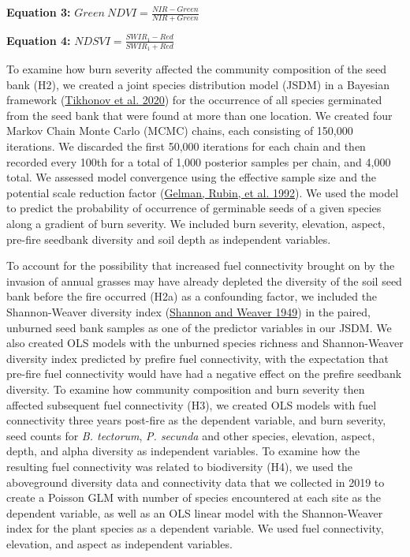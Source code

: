 \documentclass[
  12pt,
]{article}
\begin{document}
\textbf{Equation 3:} \(Green~NDVI = \frac{NIR - Green}{NIR + Green}\)

\textbf{Equation 4:} \(NDSVI = \frac{SWIR_1 - Red}{SWIR_1 + Red}\)

To examine how burn severity affected the community composition of the
seed bank (H2), we created a joint species distribution model (JSDM) in
a Bayesian framework (\protect\hyperlink{ref-HMSC}{Tikhonov et al.
2020}) for the occurrence of all species germinated from the seed bank
that were found at more than one location. We created four Markov Chain
Monte Carlo (MCMC) chains, each consisting of 150,000 iterations. We
discarded the first 50,000 iterations for each chain and then recorded
every 100th for a total of 1,000 posterior samples per chain, and 4,000
total. We assessed model convergence using the effective sample size and
the potential scale reduction factor
(\protect\hyperlink{ref-Gelman1992}{Gelman, Rubin, et al. 1992}). We
used the model to predict the probability of occurrence of germinable
seeds of a given species along a gradient of burn severity. We included
burn severity, elevation, aspect, pre-fire seedbank diversity and soil
depth as independent variables.

To account for the possibility that increased fuel connectivity brought
on by the invasion of annual grasses may have already depleted the
diversity of the soil seed bank before the fire occurred (H2a) as a
confounding factor, we included the Shannon-Weaver diversity index
(\protect\hyperlink{ref-Shannon1949}{Shannon and Weaver 1949}) in the
paired, unburned seed bank samples as one of the predictor variables in
our JSDM. We also created OLS models with the unburned species richness
and Shannon-Weaver diversity index predicted by prefire fuel
connectivity, with the expectation that pre-fire fuel connectivity would
have had a negative effect on the prefire seedbank diversity. To examine
how community composition and burn severity then affected subsequent
fuel connectivity (H3), we created OLS models with fuel connectivity
three years post-fire as the dependent variable, and burn severity, seed
counts for \emph{B. tectorum}, \emph{P. secunda} and other species,
elevation, aspect, depth, and alpha diversity as independent variables.
To examine how the resulting fuel connectivity was related to
biodiversity (H4), we used the aboveground diversity data and
connectivity data that we collected in 2019 to create a Poisson GLM with
number of species encountered at each site as the dependent variable, as
well as an OLS linear model with the Shannon-Weaver index for the plant
species as a dependent variable. We used fuel connectivity, elevation,
and aspect as independent variables.
\end{document}
